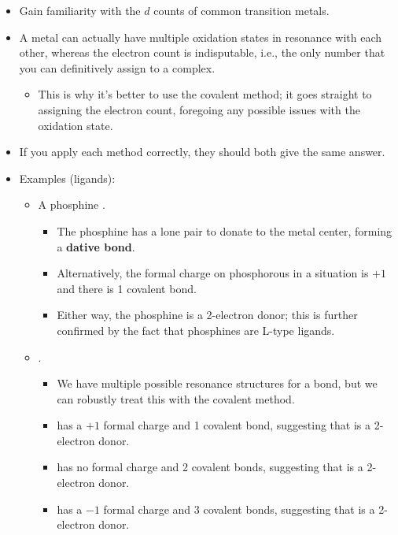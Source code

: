 \documentclass[../notes.tex]{subfiles}
\begin{document}
\begin{itemize}
    \item Gain familiarity with the $d$ counts of common transition metals.
    \item A metal can actually have multiple oxidation states in resonance with each other, whereas the electron count is indisputable, i.e., the only number that you can definitively assign to a complex.
    \begin{itemize}
        \item This is why it's better to use the covalent method; it goes straight to assigning the electron count, foregoing any possible issues with the oxidation state.
    \end{itemize}
    \item If you apply each method correctly, they should both give the same answer.
    \item Examples (ligands):
    \begin{itemize}
        \item A phosphine .
        \begin{itemize}
            \item The phosphine has a lone pair to donate to the metal center, forming a \textbf{dative bond}.
            \item Alternatively, the formal charge on phosphorous in a  situation is $+1$ and there is 1 covalent bond.
            \item Either way, the phosphine is a 2-electron donor; this is further confirmed by the fact that phosphines are L-type ligands.
        \end{itemize}
        \item {}.
        \begin{itemize}
            \item We have multiple possible resonance structures for a  bond, but we can robustly treat this with the covalent method.
            \item {}\quad has a $+1$ formal charge and 1 covalent bond, suggesting that  is a 2-electron donor.
            \item {}\quad has no formal charge and 2 covalent bonds, suggesting that  is a 2-electron donor.
            \item {}\quad has a $-1$ formal charge and 3 covalent bonds, suggesting that  is a 2-electron donor.

\end{itemize}
\end{itemize}
\end{itemize}
\end{document}

